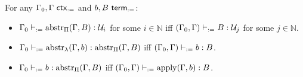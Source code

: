 \documentclass[twoside]{report}
\begin{document}
\begin{proposition}
    \label{thm:context_environment_abstr_apply}
    For any $\Gamma_0, \Gamma \ \mathsf{ctx}_{:=}$ and $b, B \ \mathsf{term}_{:=}$:
    \begin{itemize}[noitemsep]
        \item $\Gamma_0 \vdash_{:=} \operatorname{abstr}_\Pi(\Gamma, B) : \mathcal U_i$ for some $i \in \mathbb N$ iff $(\Gamma_0, \Gamma) \vdash_{:=} B : \mathcal U_j$ for some $j \in \mathbb N$.
        \item $\Gamma_0 \vdash_{:=} \operatorname{abstr}_\lambda(\Gamma, b) : \operatorname{abstr}_\Pi(\Gamma, B)$ iff $(\Gamma_0, \Gamma) \vdash_{:=} b : B$.
        \item $\Gamma_0 \vdash_{:=} b : \operatorname{abstr}_\Pi(\Gamma, B)$ iff $(\Gamma_0, \Gamma) \vdash_{:=} \operatorname{apply}(\Gamma, b) : B$.
    \end{itemize}
\end{proposition}
\end{document}
